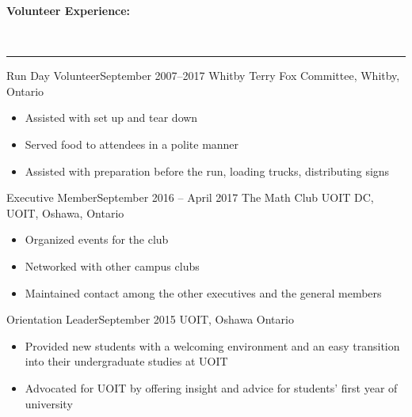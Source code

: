 \documentclass[]{article} \usepackage{lmodern} \usepackage{tabu}
\makeatletter
\newcommand{\heading}[1]
{\begin{large}\textbf{#1}\end{large}\\%
 \rule[1.2ex]{\linewidth}{0.4pt}}
\newenvironment{*subsection}[2]
{
\begin{tabu} to \linewidth {@{}X[l] r}
  \textbf{#1} &
  \textbf{#2}
\end{tabu}
}
{
  \vspace{3mm}
}
\makeatother
\begin{document}
\heading{Volunteer Experience:}
\begin{*subsection}{Run Day Volunteer}{September 2007--2017}
%
Whitby Terry Fox Committee, Whitby, Ontario
%
\begin{itemize}
\item
  Assisted with set up and tear down
\item
  Served food to attendees in a polite manner
\item
  Assisted with preparation before the run, loading trucks,
  distributing signs
\end{itemize}
\end{*subsection}
\begin{*subsection}{Executive Member}{September 2016 -- April 2017}
%
The Math Club UOIT DC, UOIT, Oshawa, Ontario
%
\begin{itemize}
\item
  Organized events for the club
\item
  Networked with other campus clubs
\item
  Maintained contact among the other executives and the general members
\end{itemize}
\end{*subsection}
\begin{*subsection}{Orientation Leader}{September 2015}
%
UOIT, Oshawa Ontario
%
\begin{itemize}
\item
  Provided new students with a welcoming environment and an easy
  transition into their undergraduate studies at UOIT
\item
  Advocated for UOIT by offering insight and advice for students'
  first year of university
\end{itemize}
\end{*subsection}
\end{document}
